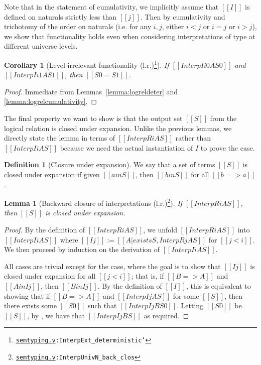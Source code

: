 \documentclass[\ifpublic nolinenum\else\fi,online,OA]{jfp}
\newcommand{\dotv}[2]{\href{#1}{\texttt{#1}}{\texttt{:#2}}}
\newtheorem{lemma}[theorem]{Lemma}
\newtheorem{corollary}[theorem]{Corollary}
\theoremstyle{definition}
\newtheorem{definition}[theorem]{Definition}
\begin{document}
Note that in the statement of cumulativity, we implicitly assume that $[[I]]$
is defined on naturals strictly less than $[[j]]$. Then by cumulativity and
trichotomy of the order on naturals (i.e. for any $i, j$, either $i < j$ or
$i = j$ or $i > j$), we show that functionality holds even when considering
interpretations of type at different universe levels.

\begin{corollary}[Level-irrelevant functionality (l.r.)\footnote{\dotv{semtyping.v}{InterpExt\_deterministic'}}]
  \label{lemma:logreldeterhet}
  If $[[Interp I i0 A S0]]$ and $[[Interp I i1 A S1]]$, then $[[S0 = S1]]$.
\end{corollary}

\begin{proof}
  Immediate from Lemmas~\ref{lemma:logreldeter} and
  \ref{lemma:logrelcumulativity}.
\end{proof}

The final property we want to show is that the output set $[[S]]$ from
the logical relation is closed under expansion. Unlike the previous
lemmas, we directly state the lemma
in terms of $[[InterpR i A S]]$ rather than $[[Interp I i A S]]$
because we need the actual instantiation of $I$ to prove the  case.

\begin{definition}[Closure under expansion]
  We say that a set of terms $[[S]]$ is closed under expansion if
  given $[[a in S]]$, then $[[b in S]]$ for all $[[b => a]]$.
\end{definition}

\begin{lemma}[Backward closure of interpretations (l.r.)\footnote{\dotv{semtyping.v}{InterpUnivN\_back\_clos}}]
  \label{lemma:logrelbackclos}
  If $[[InterpR i A S]]$, then $[[S]]$ is closed under expansion.
\end{lemma}

\begin{proof}
  By the definition of $[[InterpR i A S]]$, we unfold $[[InterpR i A S]]$ into
  $[[Interp I i A S]]$ where $[[I j]] := [[{A | exists S, InterpR j A S}]]$ for
  $[[j < i]]$. We then proceed by induction on the derivation of
  $[[Interp I i A S]]$.

  All cases are trivial except for the  case, where the goal is to
  show that $[[I j]]$ is closed under expansion for all $[[j < i]]$;
  that is, if $[[B => A]]$ and $[[A in I j]]$, then $[[B in I j]]$.
  By the definition of $[[I]]$, this is equivalent to showing that if
  $[[B => A]]$ and $[[Interp I j A S]]$ for some $[[S]]$,
  then there exists some $[[S0]]$ such that $[[Interp I j B S0]]$.
  Letting $[[S0]]$ be $[[S]]$, by ,
  we have that $[[Interp I j B S]]$ as required.
\end{proof}
\end{document}
